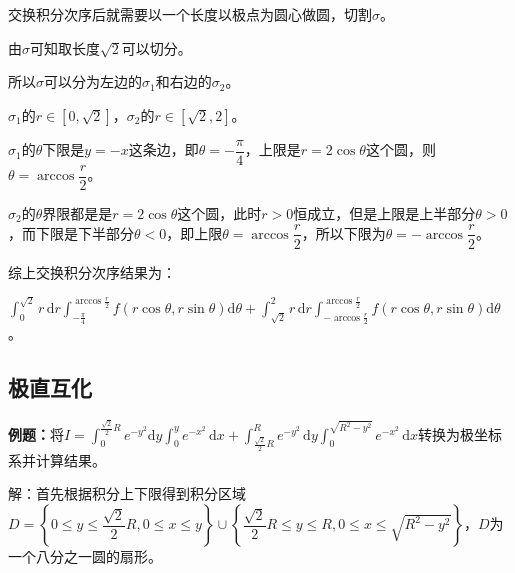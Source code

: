 \documentclass[UTF8, 12pt]{ctexart}
\begin{document}
\begin{minipage}{0.625\linewidth}
    
    交换积分次序后就需要以一个长度以极点为圆心做圆，切割$\sigma$。

    由$\sigma$可知取长度$\sqrt{2}$可以切分。

    所以$\sigma$可以分为左边的$\sigma_1$和右边的$\sigma_2$。
\end{minipage}
\hfill
\begin{minipage}{0.25\linewidth}
\end{minipage}

$\sigma_1$的$r\in[0,\sqrt{2}]$，$\sigma_2$的$r\in[\sqrt{2},2]$。

$\sigma_1$的$\theta$下限是$y=-x$这条边，即$\theta=-\dfrac{\pi}{4}$，上限是$r=2\cos\theta$这个圆，则$\theta=\arccos\dfrac{r}{2}$。

$\sigma_2$的$\theta$界限都是是$r=2\cos\theta$这个圆，此时$r>0$恒成立，但是上限是上半部分$\theta>0$，而下限是下半部分$\theta<0$，即上限$\theta=\arccos\dfrac{r}{2}$，所以下限为$\theta=-\arccos\dfrac{r}{2}$。

综上交换积分次序结果为：

$\int_0^{\sqrt{2}}r\,\textrm{d}r\int_{-\frac{\pi}{4}}^{\arccos\frac{r}{2}}f(r\cos\theta,r\sin\theta)\textrm{d}\theta+\int_{\sqrt{2}}^2r\,\textrm{d}r\int_{-\arccos\frac{r}{2}}^{\arccos\frac{r}{2}}f(r\cos\theta,r\sin\theta)\textrm{d}\theta$。

\subsection{极直互化}

\textbf{例题：}将$I=\int_0^{\frac{\sqrt{2}}{2}R}e^{-y^2}\textrm{d}y\int_0^ye^{-x^2}\,\textrm{d}x+\int_{\frac{\sqrt{2}}{2}R}^Re^{-y^2}\,\textrm{d}y\int_0^{\sqrt{R^2-y^2}}e^{-x^2}\,\textrm{d}x$转换为极坐标系并计算结果。

解：首先根据积分上下限得到积分区域$D=\left\{0\leqslant y\leqslant\dfrac{\sqrt{2}}{2}R,0\leqslant x\leqslant y\right\}\cup\left\{\dfrac{\sqrt{2}}{2}R\leqslant y\leqslant R,0\leqslant x\leqslant\sqrt{R^2-y^2}\right\}$，$D$为一个八分之一圆的扇形。
\end{document}
